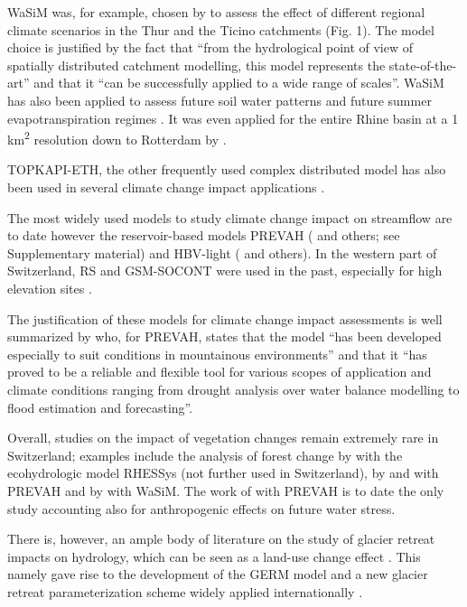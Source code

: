\documentclass[10pt,a4paper]{article}
\begin{document}
WaSiM was, for example, chosen by \citet{Jasper2004} to assess the effect of different regional climate scenarios in the Thur and the Ticino catchments (Fig. 1). The model choice is justified by the fact that ``from the hydrological point of view of spatially distributed catchment modelling, this model represents the state-of-the-art'' and that it ``can be successfully applied to a wide range of scales''.  WaSiM has also been applied to assess future soil water patterns \citep{Jasper2006,Rossler2012} and future summer evapotranspiration regimes \citep{Calanca2006}. It was even applied for the entire Rhine basin at a 1 km\textsuperscript{2} resolution down to Rotterdam by \citet{Kleinn_2005}.

TOPKAPI-ETH, the other frequently used complex distributed model has also been used in several climate change impact applications \citep{Fatichi2014,Fatichi2015,Finger_2012,Anghileri2018}. 

{The most widely used models to study climate change impact on streamflow are to date however the reservoir-based models PREVAH (}\citealt{Koplin2012,Bosshard2013a,Speich_2015,Junker_2014} and others;  see Supplementary material) and HBV-light (\citealt{Etter2017,Hakala2020,Brunner_2018,Jenicek2018}  and others). In the western part of Switzerland, RS and GSM-SOCONT were used in the past, especially for high elevation sites \citep{Horton2006,Uhlmann_2012,Uhlmann2013a,Terrier2015}.

The justification of these models for climate change impact assessments is well summarized by \citet{Koplin2010} who, for PREVAH, states that the model ``has been developed especially to suit conditions in mountainous environments'' and that it ``has proved to be a reliable and flexible tool for various scopes of application and climate conditions ranging from drought analysis over water balance modelling to flood estimation and forecasting''. 

Overall, studies on the impact of vegetation changes remain extremely rare in Switzerland; examples include the analysis of forest change by \citet{zierl05} with the ecohydrologic model RHESSys (not further used in Switzerland), by \citet{Koplin2013} and \citet{Schattan2013} with PREVAH and by \citet{Alaoui2014} with WaSiM. The work of \citet{Milano2015a} with PREVAH is to date the only study accounting also for anthropogenic effects on future water stress. 

There is, however, an ample body of literature on the study of glacier retreat impacts on hydrology, which can be seen as a land-use change effect \citep{Horton2006,Schaefli2007b,Finger2015,Etter2017,Addor2014,Junghans2011}.  This namely gave rise to the development of the GERM model \citep{Huss2016,Junghans2011,Farinotti2012,Finger2013}  and a new glacier retreat parameterization scheme widely applied internationally \citep{Huss2010}.
\end{document}
